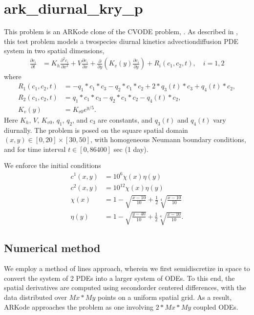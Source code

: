 \documentclass[letterpaper,10pt,english]{sphinxmanual}
\begin{document}
\section{ark\_diurnal\_kry\_p}
\label{\detokenize{c_parallel:ark-diurnal-kry-p}}\label{\detokenize{c_parallel:id3}}
\sphinxAtStartPar
This problem is an ARKode clone of the CVODE problem,
.  As described in , this test problem
models a two\sphinxhyphen{}species diurnal kinetics advection\sphinxhyphen{}diffusion PDE system
in two spatial dimensions,
\begin{equation*}
\begin{split}\frac{\partial c_i}{\partial t} &=
  K_h \frac{\partial^2 c_i}{\partial x^2} +
  V \frac{\partial     c_i}{\partial x} +
  \frac{\partial}{\partial y}\left( K_v(y)
  \frac{\partial c_i}{\partial y}\right) +
  R_i(c_1,c_2,t),\quad i=1,2\end{split}
\end{equation*}
\sphinxAtStartPar
where
\begin{equation*}
\begin{split}R_1(c_1,c_2,t) &= -q_1*c_1*c_3 - q_2*c_1*c_2 + 2*q_3(t)*c_3 + q_4(t)*c_2, \\
R_2(c_1,c_2,t) &=  q_1*c_1*c_3 - q_2*c_1*c_2 - q_4(t)*c_2, \\
K_v(y) &= K_{v0} e^{y/5}.\end{split}
\end{equation*}
\sphinxAtStartPar
Here \(K_h\), \(V\), \(K_{v0}\), \(q_1\), \(q_2\),
and \(c_3\) are constants, and \(q_3(t)\) and \(q_4(t)\)
vary diurnally.  The problem is posed on the square spatial domain
\((x,y) \in [0,20]\times[30,50]\), with homogeneous Neumann
boundary conditions, and for time interval \(t\in [0,86400]\) sec
(1 day).

\sphinxAtStartPar
We enforce the initial conditions
\begin{equation*}
\begin{split}c^1(x,y) &=  10^6 \chi(x)\eta(y) \\
c^2(x,y) &=  10^{12} \chi(x)\eta(y) \\
\chi(x) &= 1 - \sqrt{\frac{x - 10}{10}} + \frac12 \sqrt[4]{\frac{x - 10}{10}} \\
\eta(y) &= 1 - \sqrt{\frac{y - 40}{10}} + \frac12 \sqrt[4]{\frac{x - 10}{10}}.\end{split}
\end{equation*}

\subsection{Numerical method}
\label{\detokenize{c_parallel:id5}}
\sphinxAtStartPar
We employ a method of lines approach, wherein we first semi\sphinxhyphen{}discretize
in space to convert the system of 2 PDEs into a larger system of ODEs.
To this end, the spatial derivatives are computed using second\sphinxhyphen{}order
centered differences, with the data distributed over \(Mx*My\)
points on a uniform spatial grid.  As a result, ARKode approaches the
problem as one involving \(2*Mx*My\) coupled ODEs.
\end{document}
